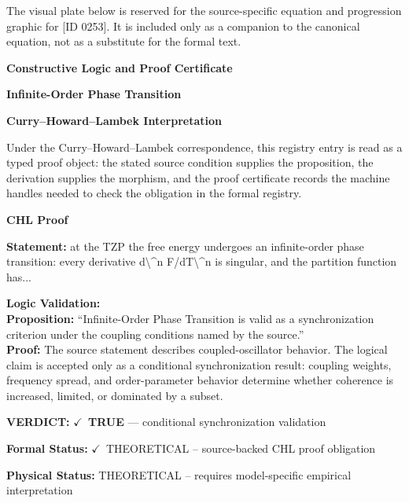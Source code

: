 \begingroup\footnotesize\sloppy
The visual plate below is reserved for the source-specific equation and progression graphic for [ID 0253]. It is included only as a companion to the canonical equation, not as a substitute for the formal text.
\par\endgroup
\ifTZPDarkEdition
{}
\fi

\clearpage
\begingroup\tzpsupportsetup
\noindent\textbf{\fontsize{10.8pt}{12.8pt}\selectfont [ID 0253] Constructive Logic and Proof Certificate}\par
\noindent\textbf{\fontsize{10pt}{12pt}\selectfont Infinite-Order Phase Transition}\par
\vspace{0.45em}
\begingroup
\footnotesize
\setlength{\parskip}{0.22em}
\setlength{\parindent}{0pt}
\noindent\textbf{Curry--Howard--Lambek Interpretation}\par
Under the Curry--Howard--Lambek correspondence, this registry entry is read as a typed proof
object: the stated source condition supplies the proposition, the derivation supplies the
morphism, and the proof certificate records the machine handles needed to check the obligation
in the formal registry.

\vspace{0.45em}
\noindent\textbf{CHL Proof}\par
\textbf{Statement:} at the TZP the free energy undergoes an infinite-order phase transition: every
derivative d\textbackslash{}\textasciicircum{}n F/dT\textbackslash{}\textasciicircum{}n is singular, and the partition function has...

\textbf{Logic Validation:}\\
\textbf{Proposition:} ``Infinite-Order Phase Transition is valid as a synchronization criterion under the
coupling conditions named by the source.''\\
\textbf{Proof:} The source statement describes coupled-oscillator behavior. The logical claim is
accepted only as a conditional synchronization result: coupling weights, frequency
spread, and order-parameter behavior determine whether coherence is increased, limited,
or dominated by a subset.

\textbf{VERDICT:} \ensuremath{\checkmark}\ \textbf{TRUE} --- conditional synchronization validation

\textbf{Formal Status:} \ensuremath{\checkmark}\ THEORETICAL -- source-backed CHL proof obligation

\textbf{Physical Status:} THEORETICAL -- requires model-specific empirical interpretation
\par\vspace{0.45em}
\par
\ifTZPDarkEdition
{}
\fi
\endgroup
\endgroup
